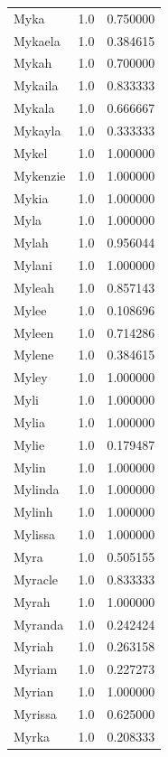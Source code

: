 \documentclass[
  letterpaper,
  DIV=11,
  numbers=noendperiod]{scrreprt}
\begin{document}
\begin{tabular}{lrr}
Myka            &   1.0 &   0.750000 \\
Mykaela         &   1.0 &   0.384615 \\
Mykah           &   1.0 &   0.700000 \\
Mykaila         &   1.0 &   0.833333 \\
Mykala          &   1.0 &   0.666667 \\
Mykayla         &   1.0 &   0.333333 \\
Mykel           &   1.0 &   1.000000 \\
Mykenzie        &   1.0 &   1.000000 \\
Mykia           &   1.0 &   1.000000 \\
Myla            &   1.0 &   1.000000 \\
Mylah           &   1.0 &   0.956044 \\
Mylani          &   1.0 &   1.000000 \\
Myleah          &   1.0 &   0.857143 \\
Mylee           &   1.0 &   0.108696 \\
Myleen          &   1.0 &   0.714286 \\
Mylene          &   1.0 &   0.384615 \\
Myley           &   1.0 &   1.000000 \\
Myli            &   1.0 &   1.000000 \\
Mylia           &   1.0 &   1.000000 \\
Mylie           &   1.0 &   0.179487 \\
Mylin           &   1.0 &   1.000000 \\
Mylinda         &   1.0 &   1.000000 \\
Mylinh          &   1.0 &   1.000000 \\
Mylissa         &   1.0 &   1.000000 \\
Myra            &   1.0 &   0.505155 \\
Myracle         &   1.0 &   0.833333 \\
Myrah           &   1.0 &   1.000000 \\
Myranda         &   1.0 &   0.242424 \\
Myriah          &   1.0 &   0.263158 \\
Myriam          &   1.0 &   0.227273 \\
Myrian          &   1.0 &   1.000000 \\
Myrissa         &   1.0 &   0.625000 \\
Myrka           &   1.0 &   0.208333 \\

\end{tabular}
\end{document}
